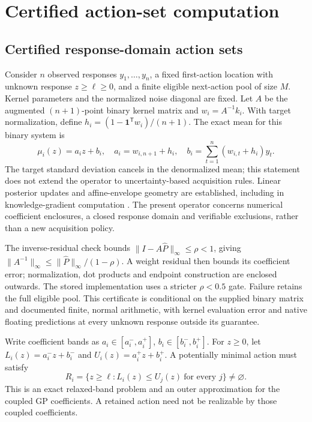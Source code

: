 \documentclass[]{interact}
\begin{document}
\section{Certified action-set computation}

\subsection{Certified response-domain action sets}\label{sec:certified_sets}

Consider $n$ observed responses $y_1,\ldots,y_n$, a fixed first-action location with unknown response $z\geq\ell\geq0$, and a finite eligible next-action pool of size $M$. Kernel parameters and the normalized noise diagonal are fixed. Let $A$ be the augmented $(n+1)$-point binary kernel matrix and $w_i=A^{-1}k_i$. With target normalization, define $h_i=(1-\mathbf{1}^{\mathsf T}w_i)/(n+1)$. The exact mean for this binary system is
\begin{equation}
\mu_i(z)=a_i z+b_i,\quad a_i=w_{i,n+1}+h_i,\quad
b_i=\sum_{t=1}^{n}(w_{i,t}+h_i)y_t.\label{eq:affine_binary}
\end{equation}
The target standard deviation cancels in the denormalized mean; this statement does not extend the operator to uncertainty-based acquisition rules. Linear posterior updates and affine-envelope geometry are established, including in knowledge-gradient computation \citep{ref40}. The present operator concerns numerical coefficient enclosures, a closed response domain and verifiable exclusions, rather than a new acquisition policy.

The inverse-residual check bounds $\|I-A\widehat{P}\|_\infty\leq\rho<1$, giving $\|A^{-1}\|_\infty\leq\|\widehat{P}\|_\infty/(1-\rho)$. A weight residual then bounds its coefficient error; normalization, dot products and endpoint construction are enclosed outwards. The stored implementation uses a stricter $\rho<0.5$ gate. Failure retains the full eligible pool. This certificate is conditional on the supplied binary matrix and documented finite, normal arithmetic, with kernel evaluation error and native floating predictions at every unknown response outside its guarantee.

Write coefficient bands as $a_i\in[a_i^-,a_i^+]$, $b_i\in[b_i^-,b_i^+]$. For $z\geq0$, let $L_i(z)=a_i^-z+b_i^-$ and $U_i(z)=a_i^+z+b_i^+$. A potentially minimal action must satisfy
\begin{equation}
R_i=\{z\geq\ell:L_i(z)\leq U_j(z)\ \text{for every }j\}\ne\varnothing.\label{eq:band_domain}
\end{equation}
This is an exact relaxed-band problem and an outer approximation for the coupled GP coefficients. A retained action need not be realizable by those coupled coefficients.
\end{document}
